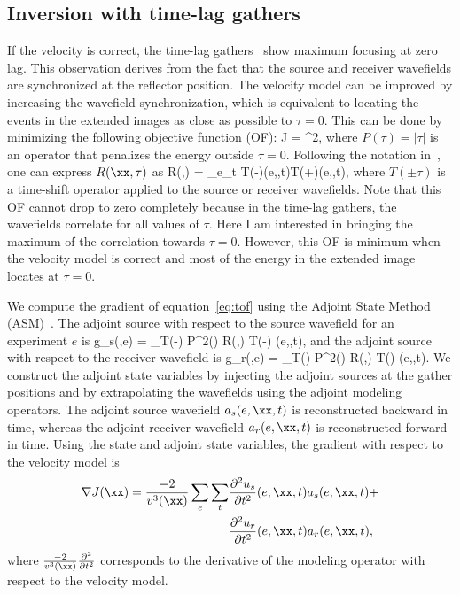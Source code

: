 \subsection{Inversion with time-lag gathers}
If the velocity is correct, the time-lag gathers~\citep{sava:S209} show maximum
 focusing at zero lag. This observation derives from the fact that the source and
 receiver wavefields are synchronized at the reflector position. 
The velocity model can be improved by increasing the wavefield synchronization, 
which is equivalent to locating the events in the extended images as close as
 possible to $\tau=0$. This can be done by minimizing the following objective 
function (OF):
\beq
J =  ^2,
\label{eq:tof}
\eeq
where $P(\tau)=|\tau|$ is an operator that penalizes the energy outside $\tau=0$.
Following the notation in~\cite{Yang2011}, one can express $R(\xx,\tau)$ as
\beq
R(\xx,\tau) = \sum_{e}\sum_t T(-\tau)\US({e},\xx,t)T(+\tau)\UR({e},\xx,t),
\eeq 
where $T(\pm\tau)$ is a time-shift operator applied to the source or receiver 
wavefields. Note that this OF cannot drop to zero completely because 
in the  time-lag gathers, the wavefields correlate  
for all values of $\tau$. Here I am interested in bringing the maximum of the
correlation towards $\tau=0$. However, this OF is minimum when the velocity model is correct
 and most of the  energy in the extended image locates at $\tau=0$.

We compute the gradient of equation~\ref{eq:tof} using the Adjoint 
State Method
 (ASM)~\citep{tarantola,plessix}. The adjoint source with respect to the source 
wavefield for an experiment $e$ is
\beq
g_s(\xx,{e}) = \sum_\tau  T(-\tau) P^2(\tau) R(\xx,\tau) T(-\tau) \UR({e},\xx,t),
\label{eq:gst}
\eeq
 and the adjoint source with respect to the receiver wavefield is
\beq
g_r(\xx,{e}) = \sum_\tau T(\tau) P^2(\tau) R(\xx,\tau) T(\tau) \US({e},\xx,t).
\label{eq:grt}
\eeq
We construct the adjoint state variables by injecting the adjoint sources at the
 gather positions and by extrapolating the wavefields using the adjoint modeling
 operators. The adjoint source wavefield $a_s({e},\xx,t)$ is reconstructed
backward in time, whereas the adjoint receiver wavefield $a_r({e},\xx,t)$ is
 reconstructed forward in time. Using the state and adjoint state variables, the 
gradient with respect to the velocity model is
\begin{align}
\nonumber \nabla J(\xx) = \frac{-2}{v^3(\xx)} \sum_{e} \sum_t &\frac{\partial^2u_s}{\partial t^2}({e},\xx,t)a_s({e},\xx,t)+\\
                          &\frac{\partial^2u_r}{\partial t^2}({e},\xx,t)a_r({e},\xx,t),
\label{eq:gradt}
\end{align}
where $\frac{-2}{v^3(\xx)}\frac{\partial^2}{\partial t^2}$ corresponds to the 
derivative of the modeling operator with respect to the
 velocity model.


